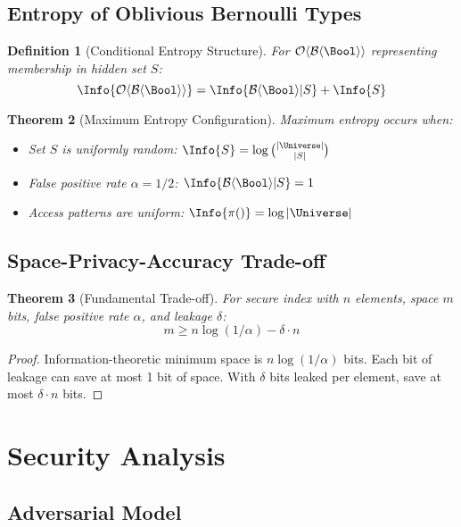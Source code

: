 \documentclass[11pt,final,hidelinks]{article}
\newcommand{\BernBool}{\mathcal{B}\langle \Bool \rangle}
\newcommand{\fprate}{\alpha}
\newtheorem{theorem}{Theorem}[section]
\newtheorem{definition}[theorem]{Definition}
\begin{document}
\subsection{Entropy of Oblivious Bernoulli Types}

\begin{definition}[Conditional Entropy Structure]
For $\Obv{\BernBool}$ representing membership in hidden set $S$:
\begin{equation}
\Info{\Obv{\BernBool}} = \Info{\BernBool | S} + \Info{S}
\end{equation}
\end{definition}

\begin{theorem}[Maximum Entropy Configuration]
Maximum entropy occurs when:
\begin{itemize}
    \item Set $S$ is uniformly random: $\Info{S} = \log \binom{|\Universe|}{|S|}$
    \item False positive rate $\fprate = 1/2$: $\Info{\BernBool|S} = 1$
    \item Access patterns are uniform: $\Info{\Pattern{}} = \log |\Universe|$
\end{itemize}
\end{theorem}

\subsection{Space-Privacy-Accuracy Trade-off}

\begin{theorem}[Fundamental Trade-off]
For secure index with $n$ elements, space $m$ bits, false positive rate $\fprate$, and leakage $\delta$:
\begin{equation}
m \geq n \log(1/\fprate) - \delta \cdot n
\end{equation}
\end{theorem}

\begin{proof}
Information-theoretic minimum space is $n\log(1/\fprate)$ bits.
Each bit of leakage can save at most 1 bit of space.
With $\delta$ bits leaked per element, save at most $\delta \cdot n$ bits.
\end{proof}

\section{Security Analysis}

\subsection{Adversarial Model}
\end{document}
